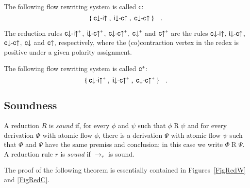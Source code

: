 \newcommand{\frc}{{\mathsf c}}
\begin{definition}
The following flow rewriting system is called $\frc$:
\[
\{\;{{\mathsf c}{\downarrow}{\hbox{-}}{\mathsf i}{\uparrow }}\;,\;{{\mathsf i}{\downarrow}{\hbox{-}}{\mathsf c}{\uparrow }}\;,\;{{\mathsf c}{\downarrow}{\hbox{-}}{\mathsf c}{\uparrow }}\;\}\quad.
\]
\end{definition}

\begin{definition}
The reduction rules $\rcdiu^\ppl$, $\ridcu^\ppl$, $\rcdcu^\ppl$, $\rcd^\ppl$ and $\rcu^\ppl$ are the rules ${{\mathsf c}{\downarrow}{\hbox{-}}{\mathsf i}{\uparrow }}$, ${{\mathsf i}{\downarrow}{\hbox{-}}{\mathsf c}{\uparrow }}$, ${{\mathsf c}{\downarrow}{\hbox{-}}{\mathsf c}{\uparrow }}$, ${\mathsf c}{\downarrow }$ and ${\mathsf c}{\uparrow }$, respectively, where the (co)contraction vertex in the redex is positive under a given polarity assignment.
\end{definition}

\newcommand{\frcp}{{\frc^\ppl}}
\begin{definition}
The following flow rewriting system is called $\frcp$:
\[
\{\;\rcdiu^\ppl\;,\;\ridcu^\ppl\;,\;\rcdcu^\ppl\;\}\quad.
\]
\end{definition}

\subsection{Soundness}

\begin{definition}
A reduction $R$ is \emph{sound} if, for every $\phi$ and $\psi$ such that $\phi\mathrel{R}\psi$ and for every derivation $\Phi$ with atomic flow $\phi$, there is a derivation $\Psi$ with atomic flow $\psi$ such that $\Phi$ and $\Psi$ have the same premiss and conclusion; in this case we write $\Phi\mathrel{R}\Psi$. A reduction rule $r$ is \emph{sound} if $\to_r$ is sound.
\end{definition}

The proof of the following theorem is essentially contained in Figures~\ref{FigRedW} and \ref{FigRedC}.

\newcommand{\ot}{\mathbin\leftarrow}

